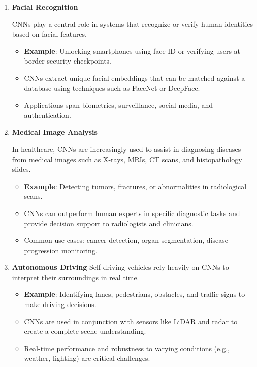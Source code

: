 \begin{enumerate}
\begin{itemize}
    \end{itemize}
    
    \item \textbf{Facial Recognition}
    
    CNNs play a central role in systems that recognize or verify human identities based on facial features.
    \begin{itemize}
        \item \textbf{Example}: Unlocking smartphones using face ID or verifying users at border security checkpoints.
        \item CNNs extract unique facial embeddings that can be matched against a database using techniques such as FaceNet or DeepFace.
        \item Applications span biometrics, surveillance, social media, and authentication.




    \end{itemize}
   
    \item \textbf{Medical Image Analysis}


    In healthcare, CNNs are increasingly used to assist in diagnosing diseases from medical images such as X-rays, MRIs, CT scans, and histopathology slides.
    \begin{itemize}
        \item \textbf{Example}: Detecting tumors, fractures, or abnormalities in radiological scans.
        \item CNNs can outperform human experts in specific diagnostic tasks and provide decision support to radiologists and clinicians.
        \item Common use cases: cancer detection, organ segmentation, disease progression monitoring.
    \end{itemize}
   
    \item \textbf{Autonomous Driving}
    Self-driving vehicles rely heavily on CNNs to interpret their surroundings in real time.
    \begin{itemize}
        \item \textbf{Example}: Identifying lanes, pedestrians, obstacles, and traffic signs to make driving decisions.
        \item CNNs are used in conjunction with sensors like LiDAR and radar to create a complete scene understanding.
        \item Real-time performance and robustness to varying conditions (e.g., weather, lighting) are critical challenges.
    \end{itemize}
\end{enumerate}
